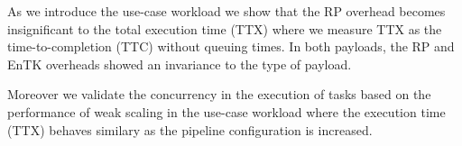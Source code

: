 

As we introduce the use-case workload we show that the RP overhead becomes
insignificant to the total execution time (TTX) where we measure TTX as the
time-to-completion (TTC) without queuing times. In both payloads, the RP and
EnTK overheads showed an invariance to the type of payload.

Moreover we validate the concurrency in the execution of tasks based on the
performance of weak scaling in the use-case workload where the execution time
(TTX) behaves similary as the pipeline configuration is increased.



